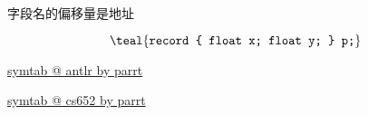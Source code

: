 \begin{frame}{}
  \begin{center}

    \pause
    \vspace{0.60cm}
     \\[6pt]
    字段名的偏移量是地址

    \pause
    \vspace{0.30cm}

    \pause
    \vspace{0.30cm}

    \pause
    \vspace{-0.60cm}
    \[
      \teal{\texttt{record \{ float x; float y; \} p;}}
    \]
  \end{center}
\end{frame}

\begin{frame}{}
  \begin{center}
  \end{center}
\end{frame}

\begin{frame}{}
  \begin{center}
    \href{https://github.com/antlr/symtab}{symtab @ antlr by parrt}

    \vspace{0.80cm}
    \href{https://github.com/parrt/cs652/tree/master/lectures/code/symtab/src}{symtab @ cs652 by parrt}
  \end{center}
\end{frame}
